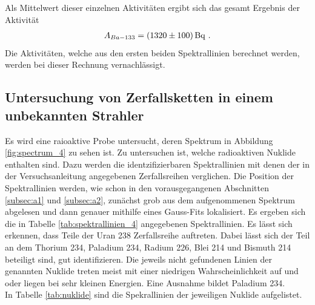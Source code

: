 Als Mittelwert dieser einzelnen Aktivitäten ergibt sich das gesamt Ergebnis der Aktivität
\begin{align*}
A_{Ba-133}=\SI{1320+-100}{\becquerel} \text{ .}
\end{align*}
Die Aktivitäten, welche aus den ersten beiden Spektrallinien berechnet werden, werden bei dieser Rechnung vernachlässigt.


\subsection{Untersuchung von Zerfallsketten in einem unbekannten Strahler }
\label{subsec:a4}
Es wird eine raioaktive Probe untersucht, deren Spektrum in Abbildung \ref{fig:spectrum_4} zu sehen ist.
Zu untersuchen ist, welche radioaktiven Nuklide enthalten sind. Dazu werden die identzifizierbaren Spektrallinien
mit denen der in der Versuchsanleitung \cite{sample} angegebenen Zerfallsreihen verglichen.  Die Position
der Spektrallinien werden, wie schon in den vorausgegangenen Abschnitten \ref{subsec:a1} und \ref{subsec:a2}, zunächst
grob aus dem aufgenommenen Spektrum abgelesen und dann genauer mithilfe eines Gauss-Fits lokalisiert.
Es ergeben sich die in Tabelle \ref{tab:spektrallinien_4}  angegebenen Spektrallinien. Es lässt sich erkennen, dass
Teile der Uran 238 Zerfallsreihe auftreten. Dabei lässt sich der Teil an dem Thorium 234, Paladium 234, Radium 226,
Blei 214 und Bismuth 214 beteiligt sind, gut identifizieren. Die jeweils nicht gefundenen Linien der genannten Nuklide
treten meist mit einer niedrigen Wahrscheinlichkeit auf und oder liegen bei sehr kleinen Energien. Eine Ausnahme bildet
Paladium 234. \\
In Tabelle \ref{tab:nuklide} sind die Spekrallinien der jeweiligen Nuklide aufgelistet.

